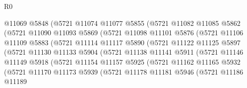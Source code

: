 \begin{lexlean}{R0}
\begin{coremodule}
                      @11069
                      @5848
                      (@5721
                        @11074
                        @11077
                        @5855
                        (@5721
                          @11082
                          @11085
                          @5862
                          (@5721
                            @11090
                            @11093
                            @5869
                            (@5721
                              @11098
                              @11101
                              @5876
                              (@5721
                                @11106
                                @11109
                                @5883
                                (@5721
                                  @11114
                                  @11117
                                  @5890
                                  (@5721
                                    @11122
                                    @11125
                                    @5897
                                    (@5721
                                      @11130
                                      @11133
                                      @5904
                                      (@5721
                                        @11138
                                        @11141
                                        @5911
                                        (@5721
                                          @11146
                                          @11149
                                          @5918
                                          (@5721
                                            @11154
                                            @11157
                                            @5925
                                            (@5721
                                              @11162
                                              @11165
                                              @5932
                                              (@5721
                                                @11170
                                                @11173
                                                @5939
                                                (@5721
                                                  @11178
                                                  @11181
                                                  @5946
                                                  (@5721
                                                    @11186
                                                    @11189

\end{coremodule}
\end{lexlean}
